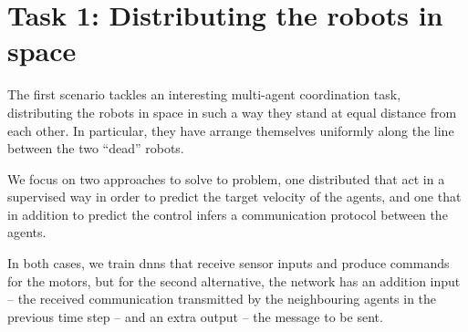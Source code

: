 \section{Task 1: Distributing the robots in space}
\label{sec:task1}

The first scenario tackles an interesting multi-agent coordination task, 
distributing the robots in space in such a way they stand at equal distance from 
each other. In particular, they have arrange themselves uniformly along the line 
between the two ``dead'' robots.

We focus on two approaches to solve to problem, one distributed that act in a 
supervised way in order to predict the target velocity of the agents, and one that 
in addition to predict the control infers a communication protocol between the 
agents. 

In both cases, we train \glspl{dnn} that receive sensor inputs and produce 
commands for the motors, but for the second alternative, the network has an 
addition input – the received communication transmitted by the neighbouring 
agents in the previous time step – and an extra output – the message to be sent.




